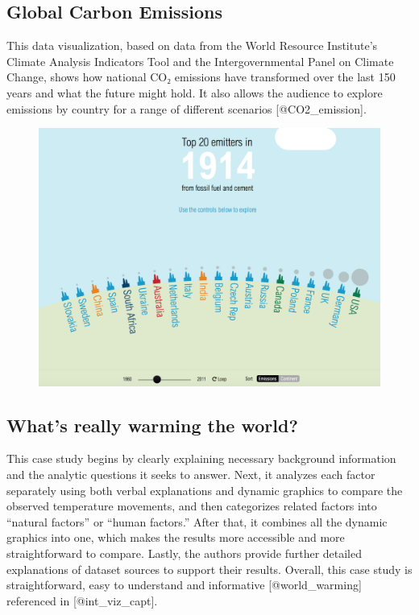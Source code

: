 \documentclass[]{book}
\theoremstyle{definition}
\theoremstyle{definition}
\theoremstyle{definition}
\theoremstyle{remark}
\begin{document}
\subsection{Global Carbon Emissions}\label{global-carbon-emissions}

This data visualization, based on data from the World Resource
Institute's Climate Analysis Indicators Tool and the Intergovernmental
Panel on Climate Change, shows how national CO₂ emissions have
transformed over the last 150 years and what the future might hold. It
also allows the audience to explore emissions by country for a range of
different scenarios {[}@CO2\_emission{]}.

\begin{figure}
\centering
\includegraphics{images/carbon_emissions.png}
\caption{}
\end{figure}

\subsection{What's really warming the
world?}\label{whats-really-warming-the-world}

This case study begins by clearly explaining necessary background
information and the analytic questions it seeks to answer. Next, it
analyzes each factor separately using both verbal explanations and
dynamic graphics to compare the observed temperature movements, and then
categorizes related factors into ``natural factors'' or ``human
factors.'' After that, it combines all the dynamic graphics into one,
which makes the results more accessible and more straightforward to
compare. Lastly, the authors provide further detailed explanations of
dataset sources to support their results. Overall, this case study is
straightforward, easy to understand and informative
{[}@world\_warming{]} referenced in {[}@int\_viz\_capt{]}.
\end{document}
